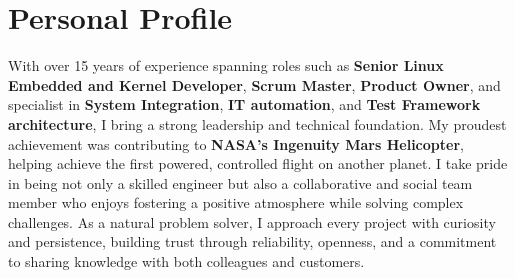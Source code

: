 \documentclass[10pt,a4paper,sans]{moderncv}
\begin{document}
\makecvtitle

\section{Personal Profile}
With over 15 years of experience spanning roles such as \textbf{Senior Linux
Embedded and Kernel Developer}, \textbf{Scrum Master}, \textbf{Product Owner},
and specialist in \textbf{System Integration}, \textbf{IT automation}, and
\textbf{Test Framework architecture}, I bring a strong leadership and technical
foundation. My proudest achievement was contributing to \textbf{NASA's
Ingenuity Mars Helicopter}, helping achieve the first powered, controlled
flight on another planet.
\newline
\newline
I take pride in being not only a skilled engineer but also a collaborative and
social team member who enjoys fostering a positive atmosphere while solving
complex challenges. As a natural problem solver, I approach every project with
curiosity and persistence, building trust through reliability, openness, and a
commitment to sharing knowledge with both colleagues and customers.

\end{document}
